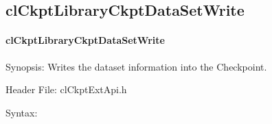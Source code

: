 \begin{flushleft}
\subsection{clCkptLibraryCkptDataSetWrite}
\hypertarget{pageckpt207}{}\paragraph{cl\-Ckpt\-Library\-Ckpt\-Data\-Set\-Write}\label{pageckpt207}
\begin{Desc}
\item[Synopsis:]Writes the dataset information into the Checkpoint.\end{Desc}
\begin{Desc}
\item[Header File:]clCkptExtApi.h\end{Desc}
\begin{Desc}
\item[Syntax:]


\end{Desc}
\end{flushleft}
